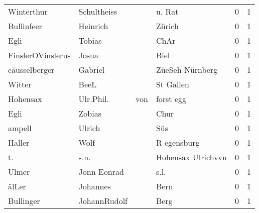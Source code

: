 \documentclass[10pt,a4paper,landscape]{article}
\begin{document}
\begin{longtable}{llllrr}
               Winterthur &                        Schultheiss &             &                                      u. Rat &          0 &         1 \\
               Bullinfeer &                           Heinrich &             &                                      Zürich &          0 &         1 \\
                     Egli &                             Tobias &             &                                        ChAr &          0 &         1 \\
        FinslerOVinslerus &                              Josua &             &                                        Biel &          0 &         1 \\
            cäusselberger &                            Gabriel &             &                             ZüeSeh Nürnberg &          0 &         1 \\
                   Witter &                               BeeL &             &                                   St Gallen &          0 &         1 \\
                 Hohensax &                          Ulr.Phil. &         von &                                   forst egg &          0 &         1 \\
                     Egli &                             Zobias &             &                                        Chur &          0 &         1 \\
                   ampell &                             Ulrich &             &                                         Süs &          0 &         1 \\
                   Haller &                               Wolf &             &                                 R egensburg &          0 &         1 \\
                       t. &                               s.n. &             &                          Hohensax Ulrichvvn &          0 &         1 \\
                    Ulmer &                        Jonn Eonrad &             &                                        s.l. &          0 &         1 \\
                    älLer &                           Johannes &             &                                        Bern &          0 &         1 \\
                Bullinger &                       JohannRudolf &             &                                        Berg &          0 &         1 \\

\end{longtable}
\end{document}
